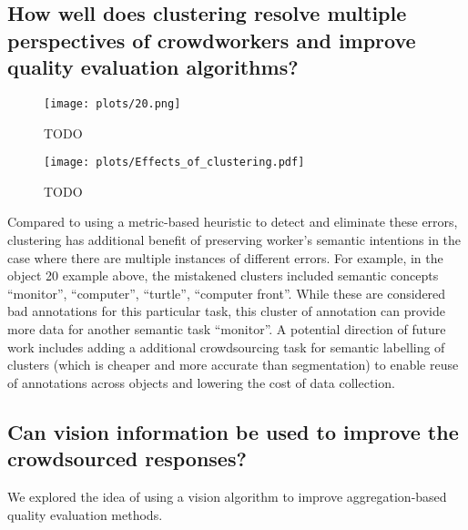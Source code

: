   \subsection{How well does clustering resolve multiple perspectives of crowdworkers and improve quality evaluation algorithms?}
    \begin{figure}[ht!]
      \centering
      \texttt{[image: plots/20.png]}
      \caption{TODO}
      \label{cluster_example}
    \end{figure}
    \begin{figure}[ht!]
      \centering
      \texttt{[image: plots/Effects\_of\_clustering.pdf]}
      \caption{TODO}
      \label{cluster_effect}
    \end{figure}
  \par Compared to using a metric-based heuristic to detect and eliminate these errors, clustering has additional benefit of preserving worker's semantic intentions in the case where there are multiple instances of different errors. For example, in the object 20 example above, the mistakened clusters included semantic concepts ``monitor'', ``computer'', ``turtle'', ``computer front''. While these are considered bad annotations for this particular task, this cluster of annotation can provide more data for another semantic task ``monitor''. A potential direction of future work includes adding a additional crowdsourcing task for semantic labelling of clusters (which is cheaper and more accurate than segmentation) to enable reuse of annotations across objects and lowering the cost of data collection. 


  \subsection{Can vision information be used to improve the crowdsourced responses?}
  We explored the idea of using a vision algorithm to improve aggregation-based quality evaluation methods. 